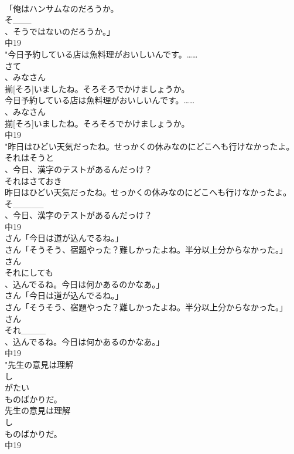 \documentclass[8pt]{extreport}
\begin{document}
\begin{CJK}{UTF8}{min}
\\	「俺はハンサムなのだろうか。
\\	そ___
\\	、そうではないのだろうか。」
\\	中19
\\	"今日予約している店は魚料理がおいしいんです。……
\\	さて
\\	、みなさん
\\	揃[そろ]いましたね。そろそろでかけましょうか。
\\	今日予約している店は魚料理がおいしいんです。……
\\	、みなさん
\\	揃[そろ]いましたね。そろそろでかけましょうか。
\\	中19
\\	"昨日はひどい天気だったね。せっかくの休みなのにどこへも行けなかったよ。
\\	それはそうと
\\	、今日、漢字のテストがあるんだっけ？ 
\\	それはさておき
\\	昨日はひどい天気だったね。せっかくの休みなのにどこへも行けなかったよ。
\\	そ_____
\\	、今日、漢字のテストがあるんだっけ？
\\	中19
\\	さん「今日は道が込んでるね。」
\\	さん「そうそう、宿題やった？難しかったよね。半分以上分からなかった。」
\\	さん
\\	それにしても
\\	、込んでるね。今日は何かあるのかなあ。」
\\	さん「今日は道が込んでるね。」
\\	さん「そうそう、宿題やった？難しかったよね。半分以上分からなかった。」
\\	さん
\\	それ____
\\	、込んでるね。今日は何かあるのかなあ。」
\\	中19
\\	"先生の意見は理解
\\	し
\\	がたい
\\	ものばかりだ。
\\	先生の意見は理解
\\	し
\\	ものばかりだ。
\\	中19

\end{CJK}
\end{document}
